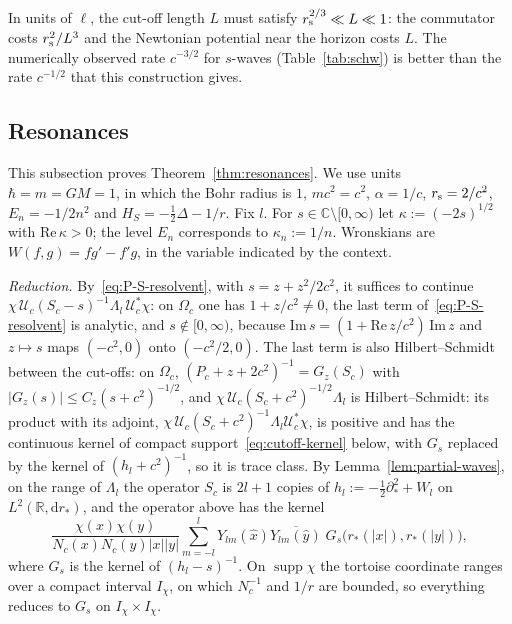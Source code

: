 \documentclass[%
 aip,
 jmp,
 amsmath,amssymb,
 reprint, onecolumn
]{revtex4-1}
\theoremstyle{definition}
\theoremstyle{remark}
\newcommand{\R}{\mathbb{R}}
\newcommand{\C}{\mathbb{C}}
\newcommand{\rmd}{\mathrm{d}}
\DeclareMathOperator{\supp}{supp}
\begin{document}
In units of $\ell$, the cut-off length $L$ must satisfy $r_{\rm s}^{2/3}
\ll L\ll1$: the
commutator costs $r_{\rm s}^2/L^3$ and the Newtonian potential near the
horizon costs $L$. The numerically observed rate $c^{-3/2}$ for
$s$-waves (Table~\ref{tab:schw}) is better than the rate $c^{-1/2}$ that
this construction gives.

\subsection{Resonances}\label{app:resonances}

This subsection proves Theorem~\ref{thm:resonances}. We use units
$\hbar=m=GM=1$, in which the Bohr radius is $1$, $mc^2=c^2$,
$\alpha=1/c$, $r_{\rm s}=2/c^2$, $E_n=-1/2n^2$ and $H_S=-\frac12\Delta-1/r$.
Fix $l$. For $s\in\C\setminus[0,\infty)$ let
$\kappa:=(-2s)^{1/2}$ with $\mathrm{Re}\,\kappa>0$; the level $E_n$
corresponds to $\kappa_n:=1/n$. Wronskians are $W(f,g)=fg'-f'g$, in the
variable indicated by the context.

\emph{Reduction.} By~\eqref{eq:P-S-resolvent}, with $s=z+z^2/2c^2$, it
suffices to continue $\chi\,\mathcal{U}_c(S_c-s)^{-1}\Lambda_l\,
\mathcal{U}_c^*\chi$: on $\Omega_c$ one has $1+z/c^2\neq0$, the last term
of~\eqref{eq:P-S-resolvent} is analytic, and $s\notin[0,\infty)$,
because $\mathrm{Im}\,s=(1+\mathrm{Re}\,z/c^2)\,\mathrm{Im}\,z$ and
$z\mapsto s$ maps $(-c^2,0)$ onto $(-c^2/2,0)$. The last term is also
Hilbert--Schmidt between the cut-offs: on $\Omega_c$,
$(P_c+z+2c^2)^{-1}=G_z(S_c)$ with $|G_z(s)|\leq C_z(s+c^2)^{-1/2}$, and
$\chi\,\mathcal{U}_c(S_c+c^2)^{-1/2}\Lambda_l$ is Hilbert--Schmidt: its
product with its adjoint, $\chi\,\mathcal{U}_c(S_c+c^2)^{-1}\Lambda_l
\mathcal{U}_c^*\chi$, is positive and has the continuous kernel of
compact support~\eqref{eq:cutoff-kernel} below, with $G_s$ replaced by
the kernel of $(h_l+c^2)^{-1}$, so it is trace class. By Lemma~\ref{lem:partial-waves}, on the range of $\Lambda_l$ the operator
$S_c$ is $2l+1$ copies of $h_l:=-\frac12\partial_*^2+W_l$ on
$L^2(\R,\rmd r_*)$, and the operator above has the kernel
\begin{equation}\label{eq:cutoff-kernel}
\frac{\chi(x)\chi(y)}{N_c(x)N_c(y)|x||y|}\sum_{m=-l}^lY_{lm}(\hat x)
\overline{Y_{lm}(\hat y)}\;G_s\bigl(r_*(|x|),r_*(|y|)\bigr),
\end{equation}
where $G_s$ is the kernel of $(h_l-s)^{-1}$. On $\supp\chi$ the tortoise
coordinate ranges over a compact interval $I_\chi$, on which $N_c^{-1}$
and $1/r$ are bounded, so everything reduces to $G_s$ on
$I_\chi\times I_\chi$.
\end{document}
